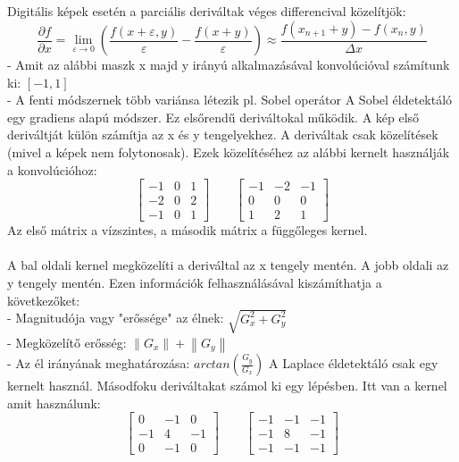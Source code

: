 Digitális képek esetén a parciális deriváltak véges differencival közelítjök:
$$ \frac{\partial f}{\partial x}=\lim_{\varepsilon \to 0} \left(\frac{f(x+\varepsilon,y)}{\varepsilon}-\frac{f(x+y)}{\varepsilon}\right)\approx \frac{f(x_{n+1}+y)-f(x_n,y)}{\Delta x}$$
\indent - Amit az alábbi maszk x majd y irányú alkalmazásával konvolúcióval számítunk ki: $[-1,1]$\\
\indent - A fenti módszernek több variánsa létezik pl. Sobel operátor
A Sobel éldetektáló egy gradiens alapú módszer. Ez elsőrendű deriváltokal működik. A kép első deriváltját külön számítja az x és y tengelyekhez. A deriváltak csak közelítések (mivel a képek nem folytonosak). Ezek közelítéséhez az alábbi kernelt használják a konvolúcióhoz:
$$\begin{bmatrix}
 -1&0  &1 \\ 
-2&0  &2 \\ 
-1&0  &1 
\end{bmatrix} 
\qquad
\begin{bmatrix}
-1&-2  &-1 \\ 
0&0  &0 \\ 
1&2  &1 
\end{bmatrix}
$$
Az első mátrix a vízszintes, a második mátrix a függőleges kernel.\\ 
\\
A bal oldali kernel megközelíti a deriváltal az x tengely mentén. A jobb oldali az y tengely mentén. Ezen információk felhasználásával kiszámíthatja a következőket:\\
\indent - Magnitudója vagy "erőssége" az élnek: $\sqrt{G_{x}^{2}+G_{y}^{2}}$ \\
\indent - Megközelítő erősség: $ \left\| G_x \right \| + \left\| G_y \right \|$\\
\indent - Az él irányának meghatározása: $arctan(\frac{G_y}{G_x})$
A Laplace éldetektáló csak egy kernelt használ. Másodfoku deriváltakat számol ki egy lépésben. Itt van a kernel amit használunk:
$$\begin{bmatrix}
 0&-1  &0 \\ 
-1&4  &-1 \\ 
 0&-1  &0 
\end{bmatrix} 
\qquad
\begin{bmatrix}
-1&-1  &-1 \\ 
-1&8  &-1 \\ 
-1&-1  &-1 
\end{bmatrix}
$$
